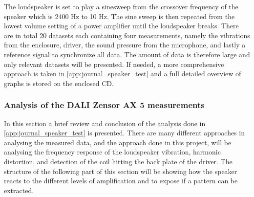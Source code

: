 The loudspeaker is set to play a sinesweep from the crossover frequency of the speaker which is 2400 Hz to 10 Hz. The sine sweep is then repeated from the lowest volume setting of a power amplifier until the loudspeaker breaks. There are in total 20 datasets each containing four measurements, namely the vibrations from the enclosure, driver, the sound pressure from the microphone, and lastly a reference signal to synchronize all data. The amount of data is therefore large and only relevant datasets will be presented. If needed, a more comprehensive approach is taken in \autoref{app:journal_speaker_test} and a full detailed overview of graphs is stored on the enclosed CD.%


\subsubsection{Analysis of the DALI Zensor AX 5 measurements}

In this section a brief review and conclusion of the analysis done in \autoref{app:journal_speaker_test} is presented. 
There are many different approaches in analysing the measured data, and the approach done in this project, will be analysing the frequency response of the loudspeaker vibration, harmonic distortion, and detection of the coil hitting the back plate of the driver. The structure of the following part of this section will be showing how the speaker reacts to the different levels of amplification and to expose if a pattern can be extracted.




